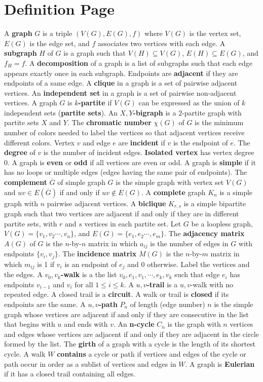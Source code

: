 \documentclass[11pt]{article}
\theoremstyle{definition}
\theoremstyle{dotles}
\theoremstyle{dotless}
\theoremstyle{remark}
\begin{document}
\section*{Definition Page}
A \textbf{graph} $G$ is a triple $(V(G),E(G),f)$ where $V(G)$ is the vertex set, $E(G)$ is the edge set, and $f$ associates two vertices with each edge. A \textbf{subgraph} $H$ of $G$ is a graph such that $V(H)\subseteq V(G)$, $E(H)\subseteq E(G)$, and $f_H=f$. A \textbf{decomposition} of a graph is a list of subgraphs such that each edge appears exactly once in each subgraph.\medbreak
Endpoints are \textbf{adjacent} if they are endpoints of a same edge. A \textbf{clique} in a graph is a set of pairwise adjacent vertices. An \textbf{independent set} in a graph is a set of pairwise non-adjacent vertices. A graph $G$ is \textbf{$k$-partite} if $V(G)$ can be expressed as the union of $k$ independent sets (\textbf{partite sets}). An \textbf{$X,Y$-bigraph} is a 2-partite graph with partite sets $X$ and $Y$. The \textbf{chromatic number} $\chi(G)$ of $G$ is the minimum number of colors needed to label the vertices so that adjacent vertices receive different colors. Vertex $v$ and edge $e$ are \textbf{incident} if $v$ is the endpoint of $e$. The \textbf{degree} of $v$ is the number of incident edges. \textbf{Isolated vertex} has vertex degree 0. A graph is \textbf{even} or \textbf{odd} if all vertices are even or odd.\medbreak
A graph is \textbf{simple} if it has no loops or multiple edges (edges having the same pair of endpoints). The \textbf{complement} $\overline{G}$ of simple graph $G$ is the simple graph with vertex set $V(G)$ and $uv\in E(\overline{G})$ if and only if $uv\not\in E(G)$. A \textbf{complete} graph $K_n$ is a simple graph with $n$ pairwise adjacent vertices. A \textbf{biclique} $K_{r,s}$ is a simple bipartite graph such that two vertices are adjacent if and only if they are in different partite sets, with $r$ and $s$ vertices in each partite set.\medbreak
Let $G$ be a loopless graph, $V(G)=\{v_1,v_2\cdots,v_n\}$, and $E(G)=\{e_1,e_2\cdots,e_m\}$. The \textbf{adjacency matrix} $A(G)$ of $G$ is the $n$-by-$n$ matrix in which $a_{ij}$ is the number of edges in $G$ with endpoints $\{v_i,v_j\}$. The \textbf{incidence matrix} $M(G)$ is the $n$-by-$m$ matrix in which $m_{ij}$ is 1 if $v_i$ is an endpoint of $e_j$ and 0 otherwise.\medbreak
Label the vertices and the edges. A \textbf{$v_0,v_k$-walk} is a the list $v_0,e_1,v_1,\cdots,e_k,v_k$ such that edge $e_i$ has endpoints $v_{i-1}$ and $v_i$ for all $1\leq i\leq k$. A \textbf{$u,v$-trail} is a $u,v$-walk with no repeated edge. A closed trail is a \textbf{circuit}. A walk or trail is \textbf{closed} if its endpoints are the same. A \textbf{$u,v$-path} $P_n$ of length (edge number) $n$ is the simple graph whose vertices are adjacent if and only if they are consecutive in the list that begins with $u$ and ends with $v$. An \textbf{n-cycle} $C_n$ is the graph with $n$ vertices and edges whose vertices are adjacent if and only if they are adjacent in the circle formed by the list. The \textbf{girth} of a graph with a cycle is the length of its shortest cycle. A walk $W$ \textbf{contains} a cycle or path if vertices and edges of the cycle or path occur in order as a sublist of vertices and edges in $W$. A graph is \textbf{Eulerian} if it has a closed trail containing all edges.\medbreak
\end{document}
